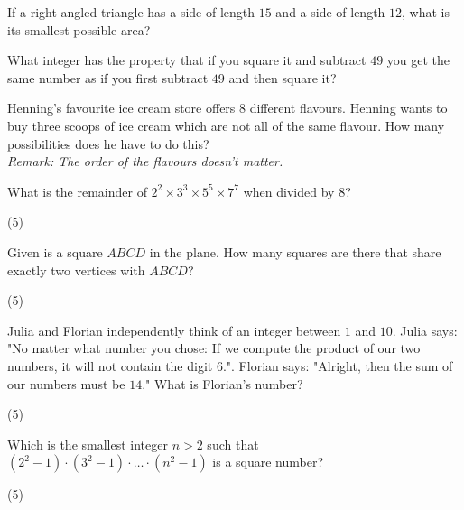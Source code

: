 \documentclass{article}
\begin{document}
\begin{problem}
If a right angled triangle has a side of length $15$ and a side of length $12$, what is its smallest possible area?
\end{problem}

\begin{problem}
What integer has the property that if you square it and subtract $49$ you get the same number as if you first subtract $49$ and then square it?
\end{problem}

\begin{problem}
Henning's favourite ice cream store offers $8$ different flavours. Henning wants to buy three scoops of ice cream which are not all of the same flavour. How many possibilities does he have to do this? \\
\emph{Remark: The order of the flavours doesn't matter.}
\end{problem}
\newpage

\begin{problem}
What is the remainder of $2^2 \times 3^3 \times 5^5 \times 7^7$ when divided by $8$?
\end{problem}
\begin{tasks}(5)
\end{tasks}

\begin{problem}
Given is a square $ABCD$ in the plane. How many squares are there that share exactly two vertices with $ABCD$?
\end{problem}
\begin{tasks}(5)
\end{tasks}

\begin{problem}
Julia and Florian independently think of an integer between $1$ and $10$. Julia says: "No matter what number you chose: If we compute the product of our two numbers, it will not contain the digit $6$.". Florian says: "Alright, then the sum of our numbers must be $14$." What is Florian's number?
\end{problem}
\begin{tasks}(5)
\end{tasks}

\begin{problem}
Which is the smallest integer $n > 2$ such that $(2^2-1)\cdot(3^2-1) \cdot \ldots \cdot (n^2-1)$ is a square number?
\end{problem}
\begin{tasks}(5)
\end{tasks}
\end{document}
